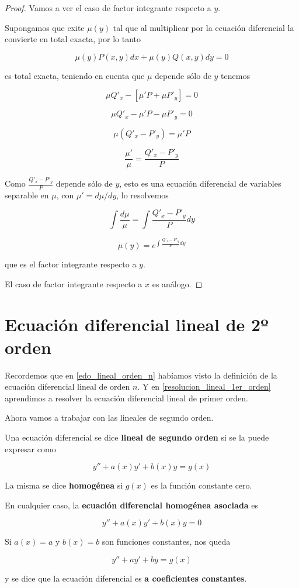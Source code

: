 \begin{proof}
Vamos a ver el caso de factor integrante respecto a $y$.  

Supongamos que exite $\mu(y)$ tal que al multiplicar por la ecuación diferencial la convierte en total exacta, por lo tanto

$$ \mu(y) P(x,y) dx + \mu(y) Q(x,y) dy = 0$$

es total exacta, teniendo en cuenta que $\mu$ depende sólo de $y$ tenemos

$$ \mu Q'_x - [\mu' P + \mu P'_y] = 0$$

$$ \mu Q'_x - \mu' P - \mu P'_y = 0$$

$$ \mu (Q'_x - P'_y ) = \mu' P $$

$$ \frac{\mu'}{\mu} = \frac{Q'_x - P'_y}{P} $$

Como $ \frac{Q'_x - P'_y}{P}$ depende sólo de $y$, esto es una ecuación diferencial de variables separable en $\mu$, con $\mu' = d\mu / dy$, lo resolvemos

$$ \int \frac{d\mu}{\mu} = \int \frac{Q'_x - P'_y}{P} dy $$

$$ \mu(y) = e^{\int \frac{Q'_x - P'_y}{P} dy} $$

que es el factor integrante respecto a $y$.

El caso de factor integrante respecto a $x$ es análogo.
\end{proof}

\section{Ecuación diferencial lineal de 2º orden}

Recordemos que en \ref{edo_lineal_orden_n} habíamos visto la definición de la ecuación diferencial lineal de orden $n$.  Y en \ref{resolucion_lineal_1er_orden} aprendimos a resolver la ecuación diferencial lineal de primer orden.

Ahora vamos a trabajar con las lineales de segundo orden.

\begin{definition} 
Una ecuación diferencial se dice \textbf{lineal de segundo orden} si se la puede expresar como

$$ y'' + a(x)y' + b(x) y = g(x) $$

La misma se dice \textbf{homogénea} si $g(x)$ es la función constante cero.  

En cualquier caso, la \textbf{ecuación diferencial homogénea asociada} es

$$ y'' + a(x)y' + b(x) y = 0 $$

Si $a(x)=a$ y $b(x)=b$ son funciones constantes, nos queda

$$ y'' + ay' + by = g(x) $$

y se dice que la ecuación diferencial es \textbf{a coeficientes constantes}.

\end{definition}

